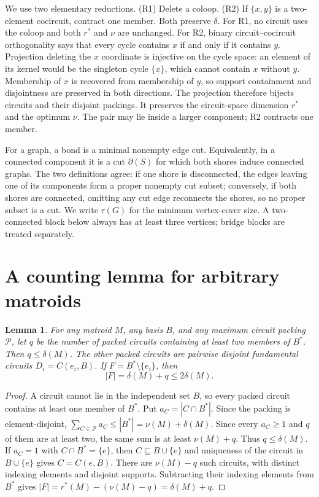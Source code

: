\documentclass[11pt]{article}
\newtheorem{lemma}[theorem]{Lemma}
\begin{document}
We use two elementary reductions.  (R1) Delete a coloop.  (R2) If
$\{x,y\}$ is a two-element cocircuit, contract one member.  Both preserve
$\delta$.  For R1, no circuit uses the coloop and both $r^*$ and $\nu$
are unchanged.  For R2, binary circuit--cocircuit orthogonality says
that every cycle contains $x$ if and only if it contains $y$.
Projection deleting the $x$ coordinate is injective on the cycle space:
an element of its kernel would be the singleton cycle $\{x\}$, which
cannot contain $x$ without $y$.  Membership of $x$ is recovered from
membership of $y$, so support containment and disjointness are preserved
in both directions.  The projection therefore bijects circuits and
their disjoint packings.  It preserves the circuit-space dimension
$r^*$ and the optimum $\nu$.  The pair may lie inside a larger
component; R2 contracts one member.

For a graph, a bond is a minimal nonempty edge cut.  Equivalently, in a
connected component it is a cut $\partial(S)$ for which both shores
induce connected graphs.  The two definitions agree: if one shore is
disconnected, the edges leaving one of its components form a proper
nonempty cut subset; conversely, if both shores are connected, omitting
any cut edge reconnects the shores, so no proper subset is a cut.
We write $\tau(G)$ for the minimum vertex-cover size.  A two-connected
block below always has at least three vertices; bridge blocks are treated
separately.

\section{A counting lemma for arbitrary matroids}
\begin{lemma}\label{lem:count}
For any matroid $M$, any basis $B$, and any maximum circuit packing
$\mathcal P$, let $q$ be the number of packed circuits containing at
least two members of $B^*$.  Then $q\leq\delta(M)$.  The other packed
circuits are pairwise disjoint fundamental circuits $D_i=C(e_i,B)$.
If $F=B^*\setminus\{e_i\}$, then
\begin{equation}\label{eq:count}
 |F|=\delta(M)+q\leq2\delta(M).
\end{equation}
\end{lemma}
\begin{proof}
A circuit cannot lie in the independent set $B$, so every packed
circuit contains at least one member of $B^*$.  Put
$a_C=|C\cap B^*|$.  Since the packing is element-disjoint,
$\sum_{C\in\mathcal P}a_C\leq|B^*|=\nu(M)+\delta(M)$.
Since every $a_C\geq1$ and $q$ of them are at least two, the same sum
is at least $\nu(M)+q$.  Thus $q\leq\delta(M)$.  If $a_C=1$ with
$C\cap B^*=\{e\}$, then $C\subseteq B\cup\{e\}$ and uniqueness of
the circuit in $B\cup\{e\}$ gives $C=C(e,B)$.  There are
$\nu(M)-q$ such circuits, with distinct indexing elements and disjoint
supports.  Subtracting their indexing elements from $B^*$ gives
$|F|=r^*(M)-(\nu(M)-q)=\delta(M)+q$.
\end{proof}
\end{document}
